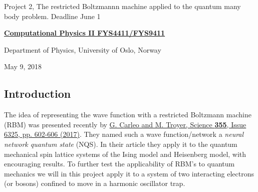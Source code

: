 \documentclass[%
oneside,                 %
final,                   %
10pt]{article}
\begin{document}

\newcommand{\exercisesection}[1]{\subsection*{#1}}






\thispagestyle{empty}

\begin{center}
{\LARGE\bf
\begin{spacing}{1.25}
Project 2, The restricted Boltzmannn machine applied to the quantum many body problem. Deadline June 1  
\end{spacing}
}
\end{center}


\begin{center}
{\bf \href{{http://www.uio.no/studier/emner/matnat/fys/FYS4411/index-eng.html}}{Computational Physics II FYS4411/FYS9411}}
\end{center}

    \begin{center}
\centerline{{\small Department of Physics, University of Oslo, Norway}}
\end{center}
    

\begin{center}
May 9, 2018
\end{center}

\vspace{1cm}


\subsection{Introduction}
The idea of representing the wave function with
a restricted Boltzmann machine (RBM) was presented recently by \href{{http://science.sciencemag.org/content/355/6325/602}}{G. Carleo and M. Troyer, Science \textbf{355}, Issue 6325, pp. 602-606 (2017)}. They
named such a wave function/network a \textit{neural network quantum
state} (NQS). In their article they apply it to the quantum mechanical
spin lattice systems of the Ising model and Heisenberg model, with
encouraging results. To further test the applicability of RBM's to
quantum mechanics we will in this project apply it to a system of
two interacting electrons (or bosons) confined to move in a harmonic oscillator trap.
\end{document}
